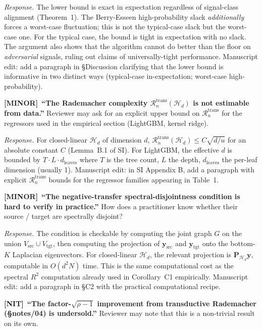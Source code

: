 \documentclass[11pt,a4paper]{article}
\theoremstyle{plain}
\newcommand{\by}{\mathbf{y}}
\newcommand{\bP}{\mathbf{P}}
\newcommand{\Hcal}{\mathcal{H}}
\newcommand{\Rcal}{\mathcal{R}}
\newcommand{\Minor}{\textcolor{minorobj}{\textbf{[MINOR]}}\ }
\newcommand{\Nit}{\textcolor{nitobj}{\textbf{[NIT]}}\ }
\begin{document}
\emph{Response.}  The lower bound is exact in expectation regardless
of signal-class alignment (Theorem~1).  The Berry-Esseen high-probability
slack \emph{additionally} forces a worst-case fluctuation; this is
not the typical-case slack but the worst-case one.  For the typical
case, the bound is tight in expectation with no slack.  The argument
also shows that the algorithm cannot do better than the floor on
\emph{adversarial} signals, ruling out claims of universally-tight
performance.  Manuscript edit: add a paragraph in §Discussion
clarifying that the lower bound is informative in two distinct ways
(typical-case in-expectation; worst-case high-probability).

\smallskip
\Minor \textbf{``The Rademacher complexity $\Rcal^{\mathrm{trans}}_n(\Hcal_d)$
is not estimable from data.''}  Reviewer may ask for an
explicit upper bound on $\Rcal^{\mathrm{trans}}_n$ for the regressors
used in the empirical section (LightGBM, kernel ridge).

\emph{Response.}  For closed-linear $\Hcal_d$ of dimension $d$,
$\Rcal^{\mathrm{trans}}_n(\Hcal_d) \leq C \sqrt{d/u}$ for an absolute
constant $C$ (Lemma~B.1 of SI).  For LightGBM, the effective $d$ is
bounded by $T \cdot L \cdot d_{\mathrm{leaves}}$ where $T$ is the tree
count, $L$ the depth, $d_{\mathrm{leaves}}$ the per-leaf dimension
(usually 1).  Manuscript edit: in SI Appendix B, add a paragraph with
explicit $\Rcal^{\mathrm{trans}}_n$ bounds for the regressor families
appearing in Table~1.

\smallskip
\Minor \textbf{``The negative-transfer spectral-disjointness condition
is hard to verify in practice.''}  How does a practitioner know whether
their source / target are spectrally disjoint?

\emph{Response.}  The condition is checkable by computing the joint
graph $G$ on the union $V_{\mathrm{src}} \cup V_{\mathrm{tgt}}$, then
computing the projection of $\by_{\mathrm{src}}$ and $\by_{\mathrm{tgt}}$
onto the bottom-$K$ Laplacian eigenvectors.  For closed-linear
$\Hcal_d$, the relevant projection is $\bP_{\Hcal_d}\by$, computable
in $O(d^2 N)$ time.  This is the same computational cost as the
spectral $R^2$ computation already used in Corollary~C1
empirically.  Manuscript edit: add a paragraph in §C2 with the
practical computational recipe.

\smallskip
\Nit \textbf{``The factor-$\sqrt{\rho - 1}$ improvement from
transductive Rademacher (§notes/04) is undersold.''}  Reviewer may
note that this is a non-trivial result on its own.
\end{document}

